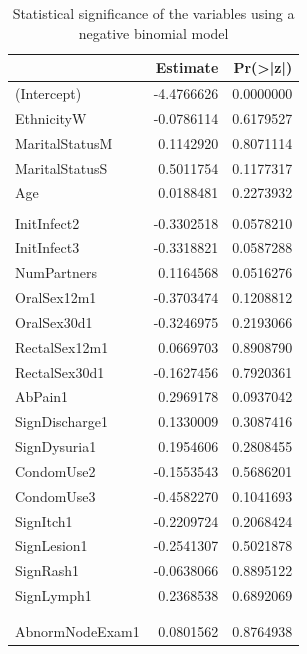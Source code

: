 \documentclass[
]{article}
\begin{document}
\begin{table}

\caption{\label{tab:variable-select}Statistical significance of the variables using a negative binomial model}
\centering
\begin{tabular}[t]{l|r|r}
\hline
  & Estimate & Pr(>|z|)\\
\hline
(Intercept) & -4.4766626 & 0.0000000\\
\hline
EthnicityW & -0.0786114 & 0.6179527\\
\hline
MaritalStatusM & 0.1142920 & 0.8071114\\
\hline
MaritalStatusS & 0.5011754 & 0.1177317\\
\hline
Age & 0.0188481 & 0.2273932\\
\hline
\cellcolor{blue}{\textcolor{white}{YearsSchool}} & \cellcolor{blue}{\textcolor{white}{-0.1689015}} & \cellcolor{blue}{\textcolor{white}{0.0001358}}\\
\hline
InitInfect2 & -0.3302518 & 0.0578210\\
\hline
InitInfect3 & -0.3318821 & 0.0587288\\
\hline
NumPartners & 0.1164568 & 0.0516276\\
\hline
OralSex12m1 & -0.3703474 & 0.1208812\\
\hline
OralSex30d1 & -0.3246975 & 0.2193066\\
\hline
RectalSex12m1 & 0.0669703 & 0.8908790\\
\hline
RectalSex30d1 & -0.1627456 & 0.7920361\\
\hline
AbPain1 & 0.2969178 & 0.0937042\\
\hline
SignDischarge1 & 0.1330009 & 0.3087416\\
\hline
SignDysuria1 & 0.1954606 & 0.2808455\\
\hline
CondomUse2 & -0.1553543 & 0.5686201\\
\hline
CondomUse3 & -0.4582270 & 0.1041693\\
\hline
SignItch1 & -0.2209724 & 0.2068424\\
\hline
SignLesion1 & -0.2541307 & 0.5021878\\
\hline
SignRash1 & -0.0638066 & 0.8895122\\
\hline
SignLymph1 & 0.2368538 & 0.6892069\\
\hline
\cellcolor{blue}{\textcolor{white}{InvVagAtExam1}} & \cellcolor{blue}{\textcolor{white}{0.5726933}} & \cellcolor{blue}{\textcolor{white}{0.0042620}}\\
\hline
\cellcolor{blue}{\textcolor{white}{DischargeExam1}} & \cellcolor{blue}{\textcolor{white}{-0.5805191}} & \cellcolor{blue}{\textcolor{white}{0.0310111}}\\
\hline
AbnormNodeExam1 & 0.0801562 & 0.8764938\\
\hline
\end{tabular}
\end{table}
\end{document}
